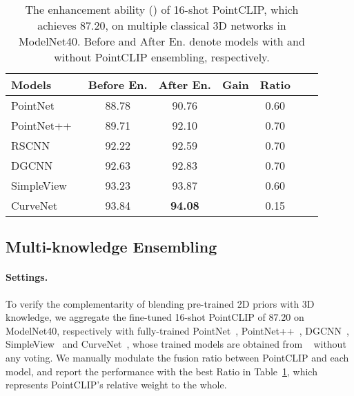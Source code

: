 \documentclass[10pt,twocolumn,letterpaper]{article}
\begin{document}
\begin{table}[t]
\centering
\vspace*{13pt}
\begin{adjustbox}{width=\linewidth}
	\begin{tabular}{lcccccc}
	\toprule
		Models & Before En. & After En. & Gain &Ratio\\ \midrule
		PointNet~\cite{qi2017pointnet} &88.78 &90.76 &\color{blue}{+1.98} &0.60\\
		PointNet++~\cite{qi2017pointnet++} & 89.71 & 92.10 &\color{blue}{+2.39} &0.70\\
		RSCNN~\cite{liu2019relation} & 92.22 & 92.59 &\color{blue}{+0.37} &0.70\\
		DGCNN~\cite{wang2019dynamic} & 92.63 & 92.83  &\color{blue}{+0.20} &0.70\\
		SimpleView~\cite{goyal2021revisiting} & 93.23 & 93.87 & \color{blue}{+0.64} &0.60\\
		CurveNet~\cite{muzahid2020curvenet} & 93.84 & \textbf{94.08} & \color{blue}{+0.24} &0.15\\
	\bottomrule
	\end{tabular}
\end{adjustbox}
\caption{The enhancement ability () of 16-shot PointCLIP, which achieves 87.20, on multiple classical 3D networks in ModelNet40. Before and After En. denote models with and without PointCLIP ensembling, respectively.}
\vspace*{-12pt}
\label{ensemble}
\end{table}


\vspace*{1pt}
\subsection{Multi-knowledge Ensembling}

\paragraph{Settings.} To verify the complementarity of blending pre-trained 2D priors with 3D knowledge, we aggregate the fine-tuned 16-shot PointCLIP of 87.20 on ModelNet40, respectively with fully-trained PointNet~\cite{qi2017pointnet}, PointNet++~\cite{qi2017pointnet++}, DGCNN~\cite{wang2019dynamic}, SimpleView~\cite{goyal2021revisiting} and CurveNet~\cite{muzahid2020curvenet}, whose trained models are obtained from ~\cite{simpleview2021,curvenet} without any voting. We manually modulate the fusion ratio between PointCLIP and each model, and report the performance with the best Ratio in Table~\ref{ensemble}, which represents PointCLIP's relative weight to the whole.
\end{document}
